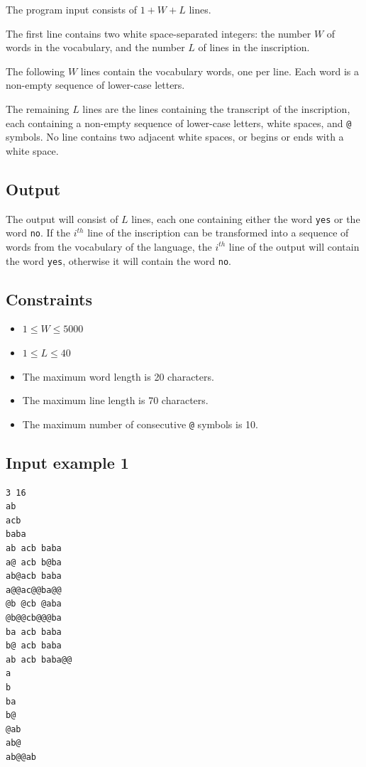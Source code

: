 \documentclass[11pt]{report}
\begin{document}
The program input consists of $1 + W + L$ lines.

The first line contains two white space-separated integers: the number
$W$ of words in the vocabulary, and the number $L$ of lines in the
inscription.

The following $W$ lines contain the vocabulary words, one per line.
Each word is a non-empty sequence of lower-case letters.

The remaining $L$ lines are the lines containing the transcript of the
inscription, each containing a non-empty sequence of lower-case
letters, white spaces, and \texttt{@} symbols. No line contains two
adjacent white spaces, or begins or ends with a white space.


\subsection*{Output}

The output will consist of $L$ lines, each one containing either the
word \texttt{yes} or the word \texttt{no}. If the $i^{th}$ line of the
inscription can be transformed into a sequence of words from the
vocabulary of the language, the $i^{th}$ line of the output will
contain the word \texttt{yes}, otherwise it will contain the word
\texttt{no}.


\subsection*{Constraints}


\begin{itemize}
\item $1 \le W \le 5000$
\item $1 \le L \le 40$
\end{itemize}
\begin{itemize}
\item The maximum word length is 20 characters.
\item The maximum line length is 70 characters.
\item The maximum number of consecutive \texttt{@} symbols is 10.
\end{itemize}


\subsection*{Input example 1}

\begin{verbatim}
3 16
ab
acb
baba
ab acb baba
a@ acb b@ba
ab@acb baba
a@@ac@@ba@@
@b @cb @aba
@b@@cb@@@ba
ba acb baba
b@ acb baba
ab acb baba@@
a
b
ba
b@
@ab
ab@
ab@@ab
\end{verbatim}
\end{document}
